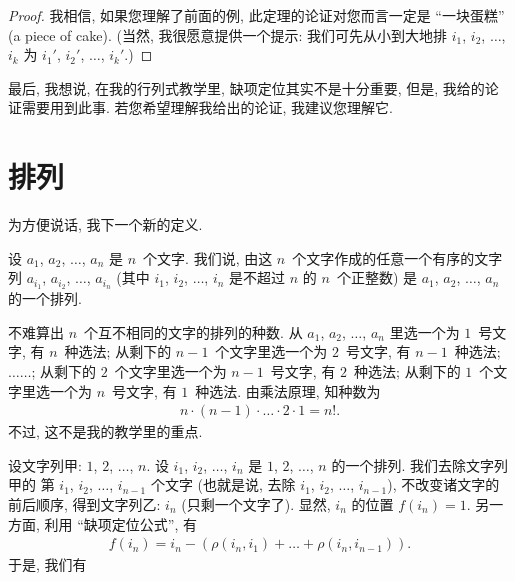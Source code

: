 \documentclass[%
    UTF8,%
    fontset=none,%
    punct=kaiming,%
    zihao=-4,%
    a4paper,%
    oneside,%
]{ctexbook}
\let\emph\relax
\begin{document}
\begin{proof}
    我相信, 如果您理解了前面的例,
    此定理的论证对您而言一定是 ``一块蛋糕''
    (a piece of cake).
    (当然,
    我很愿意提供一个提示:
    我们可先从小到大地排
    \(i_1\), \(i_2\), \(\dots\), \(i_k\)
    为
    \(i_1'\), \(i_2'\), \(\dots\), \(i_k'\).)
\end{proof}

最后, 我想说,
在我的行列式教学里,
缺项定位其实不是十分重要,
但是,
我给的论证需要用到此事.
若您希望理解我给出的论证,
我建议您理解它.

\section{排列}

为方便说话, 我下一个新的定义.

\begin{definition}[排列]
    设 \(a_1\), \(a_2\), \(\dots\), \(a_n\) 是%
    \emph{互不相同的} \(n\)~个文字.
    我们说, 由这 \(n\)~个文字作成的任意一个有序的文字列
    \(a_{i_1}\), \(a_{i_2}\), \(\dots\), \(a_{i_n}\)
    (其中 \(i_1\), \(i_2\), \(\dots\), \(i_n\)
    是\emph{互不相同的}不超过 \(n\) 的 \(n\)~个正整数)
    是 \(a_1\), \(a_2\), \(\dots\), \(a_n\)
    的一个排列.
\end{definition}

不难算出 \(n\)~个互不相同的文字的排列的种数.
从 \(a_1\), \(a_2\), \(\dots\), \(a_n\) 里选一个为 \(1\)~号文字,
有 \(n\)~种选法;
从剩下的 \(n-1\)~个文字里选一个为 \(2\)~号文字,
有 \(n-1\)~种选法;
\(\dots \dots\);
从剩下的 \(2\)~个文字里选一个为 \(n-1\)~号文字,
有 \(2\)~种选法;
从剩下的 \(1\)~个文字里选一个为 \(n\)~号文字,
有 \(1\)~种选法.
由乘法原理, 知种数为
\begin{align*}
    n \cdot (n - 1) \cdot \dots \cdot 2 \cdot 1 = n!.
\end{align*}
不过, 这不是我的教学里的重点.

设文字列甲: \(1\), \(2\), \(\dots\), \(n\).
设 \(i_1\), \(i_2\), \(\dots\), \(i_n\) 是
\(1\), \(2\), \(\dots\), \(n\) 的一个排列.
我们去除文字列甲的%
第 \(i_1\), \(i_2\), \(\dots\), \(i_{n-1}\) 个文字
(也就是说, 去除 \(i_1\), \(i_2\), \(\dots\), \(i_{n-1}\)),
不改变诸文字的前后顺序,
得到文字列乙: \(i_n\)
(只剩一个文字了).
显然, \(i_n\) 的位置 \(f(i_n) = 1\).
另一方面, 利用 ``缺项定位公式'', 有
\begin{align*}
    f(i_n) = i_n - (\rho(i_n, i_1) + \dots + \rho(i_n, i_{n-1})).
\end{align*}
于是, 我们有
\end{document}
